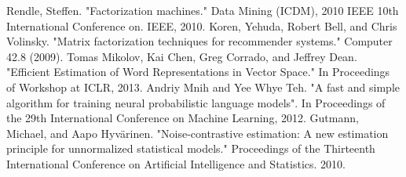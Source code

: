 \documentclass{article}
\begin{document}



\begin{thebibliography}{9}
 Rendle, Steffen. "Factorization machines." Data Mining (ICDM), 2010 IEEE 10th International Conference on. IEEE, 2010.
Koren, Yehuda, Robert Bell, and Chris Volinsky. "Matrix factorization techniques for recommender systems." Computer 42.8 (2009).
 Tomas Mikolov, Kai Chen, Greg Corrado, and Jeffrey Dean. "Efficient Estimation of Word Representations in Vector Space." In Proceedings of Workshop at ICLR, 2013.
 Andriy Mnih and Yee Whye Teh. "A fast and simple algorithm for training neural probabilistic language models". In Proceedings of the 29th International Conference on Machine Learning, 2012.
 Gutmann, Michael, and Aapo Hyvärinen. "Noise-contrastive estimation: A new estimation principle for unnormalized statistical models." Proceedings of the Thirteenth International Conference on Artificial Intelligence and Statistics. 2010.
\end{thebibliography}
\end{document}

